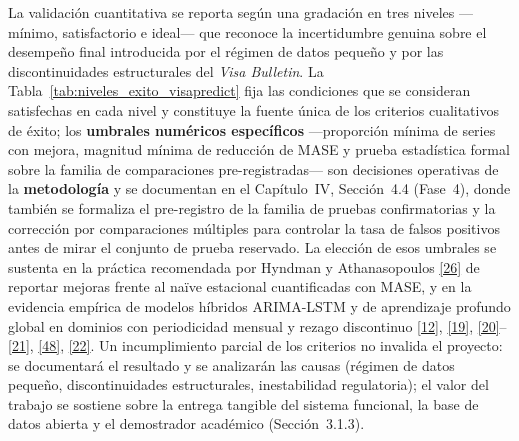 \documentclass[12pt,letterpaper]{report}
\newcommand{\cita}[1]{\hyperref[bib:#1]{[#1]}}
\begin{document}
La validación cuantitativa se reporta según una gradación en tres niveles ---mínimo, satisfactorio e ideal--- que reconoce la incertidumbre genuina sobre el desempeño final introducida por el régimen de datos pequeño y por las discontinuidades estructurales del \textit{Visa Bulletin}. La Tabla~\ref{tab:niveles_exito_visapredict} fija las condiciones que se consideran satisfechas en cada nivel y constituye la fuente única de los criterios cualitativos de éxito; los \textbf{umbrales numéricos específicos} ---proporción mínima de series con mejora, magnitud mínima de reducción de MASE y prueba estadística formal sobre la familia de comparaciones pre-registradas--- son decisiones operativas de la \textbf{metodología} y se documentan en el Capítulo~IV, Sección~4.4 (Fase~4), donde también se formaliza el pre-registro de la familia de pruebas confirmatorias y la corrección por comparaciones múltiples para controlar la tasa de falsos positivos antes de mirar el conjunto de prueba reservado. La elección de esos umbrales se sustenta en la práctica recomendada por Hyndman y Athanasopoulos \cita{26} de reportar mejoras frente al naïve estacional cuantificadas con MASE, y en la evidencia empírica de modelos híbridos ARIMA-LSTM y de aprendizaje profundo global en dominios con periodicidad mensual y rezago discontinuo \cita{12}, \cita{19}, \cita{20}--\cita{21}, \cita{48}, \cita{22}. Un incumplimiento parcial de los criterios no invalida el proyecto: se documentará el resultado y se analizarán las causas (régimen de datos pequeño, discontinuidades estructurales, inestabilidad regulatoria); el valor del trabajo se sostiene sobre la entrega tangible del sistema funcional, la base de datos abierta y el demostrador académico (Sección~3.1.3).
\end{document}

